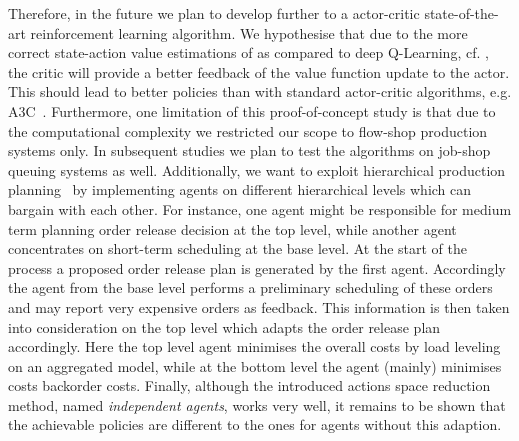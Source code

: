 \documentclass[envcountsame]{llncs}
\newcommand\MS[2][r]{\ifx t#1 \textcolor{blue}{[\textbf{MS:} #2]}
  \else \begin{center}\textcolor{blue}{\textbf{MS:} #2} \end{center} \fi}
\begin{document}
Therefore, in the future we plan to develop \ARA{} further to a actor-critic state-of-the-art
reinforcement learning algorithm. We hypothesise that due to the more correct state-action value
estimations of \ARA{} as compared to deep Q-Learning, cf. \citet{schneckenreither2020average}, the
critic will provide a better feedback of the value function update to the actor. This should lead to
better policies than with standard actor-critic algorithms, e.g. A3C~\citep{mnih2016asynchronous}.
%
Furthermore, one limitation of this proof-of-concept study is that due to the computational
complexity we restricted our scope to flow-shop production systems only. In subsequent studies we
plan to test the algorithms on job-shop queuing systems as well.
%
Additionally, we want to exploit hierarchical production
planning~\citep{schneeweibeta1995hierarchical} by implementing agents on different hierarchical
levels which can bargain with each other. For instance, one agent might be responsible for medium
term planning order release decision at the top level, while another agent concentrates on
short-term scheduling at the base level. At the start of the process a proposed order release plan
is generated by the first agent. Accordingly the agent from the base level performs a preliminary
scheduling of these orders and may report very expensive orders as feedback. This information is
then taken into consideration on the top level which adapts the order release plan accordingly. Here
the top level agent minimises the overall costs by load leveling on an aggregated model, while at
the bottom level the agent (mainly) minimises costs backorder costs.
%
Finally, although the introduced actions space reduction method, named \textit{independent agents},
works very well, it remains to be shown that the achievable policies are different to the ones for
agents without this adaption.





\end{document}
